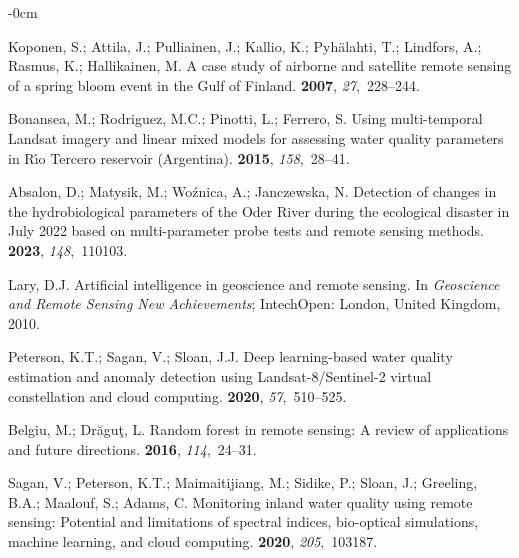 \documentclass[remotesensing,article,accept,pdftex,moreauthors]{Definitions/mdpi}
\begin{document}
\begin{adjustwidth}{-\extralength}{0cm}
\begin{thebibliography}{999}
Koponen, S.; Attila, J.; Pulliainen, J.; Kallio, K.; Pyh{\"a}lahti, T.;
  Lindfors, A.; Rasmus, K.; Hallikainen, M.
\newblock A case study of airborne and satellite remote sensing of a spring
  bloom event in the Gulf of Finland.
 {\bf 2007}, {\em 27},~228--244.

Bonansea, M.; Rodriguez, M.C.; Pinotti, L.; Ferrero, S.
\newblock Using multi-temporal Landsat imagery and linear mixed models for
  assessing water quality parameters in R{\'\i}o Tercero reservoir (Argentina).
 {\bf 2015}, {\em 158},~28--41.

Absalon, D.; Matysik, M.; Wo{\'z}nica, A.; Janczewska, N.
\newblock Detection of changes in the hydrobiological parameters of the Oder
  River during the ecological disaster in July 2022 based on multi-parameter
  probe tests and remote sensing methods.
 {\bf 2023}, {\em 148},~110103.

Lary, D.J.
\newblock Artificial intelligence in geoscience and remote sensing. In {\em
  Geoscience and Remote Sensing New Achievements}; IntechOpen: London, United Kingdom,
  2010.

Peterson, K.T.; Sagan, V.; Sloan, J.J.
\newblock Deep learning-based water quality estimation and anomaly detection
  using Landsat-8/Sentinel-2 virtual constellation and cloud computing.
 {\bf 2020}, {\em 57},~510--525.

Belgiu, M.; Dr{\u{a}}gu{\c{t}}, L.
\newblock Random forest in remote sensing: A review of applications and future
  directions.
 {\bf 2016},
  {\em 114},~24--31.

Sagan, V.; Peterson, K.T.; Maimaitijiang, M.; Sidike, P.; Sloan, J.; Greeling,
  B.A.; Maalouf, S.; Adams, C.
\newblock Monitoring inland water quality using remote sensing: Potential and
  limitations of spectral indices, bio-optical simulations, machine learning,
  and cloud computing.
 {\bf 2020}, {\em 205},~103187.


\end{thebibliography}
\end{adjustwidth}
\end{document}
